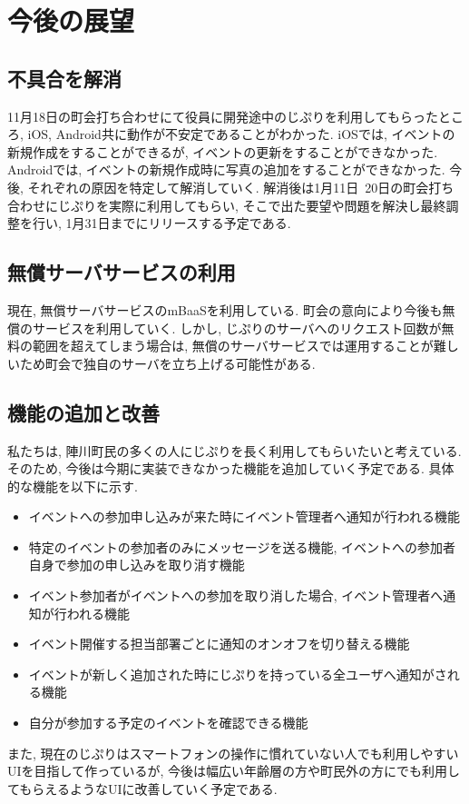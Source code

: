 \chapter{今後の展望}

\section{不具合を解消}
11月18日の町会打ち合わせにて役員に開発途中のじぷりを利用してもらったところ, iOS,  Android共に動作が不安定であることがわかった.
iOSでは, イベントの新規作成をすることができるが, イベントの更新をすることができなかった. Androidでは, イベントの新規作成時に写真の追加をすることができなかった.
今後, それぞれの原因を特定して解消していく. 解消後は1月11日~20日の町会打ち合わせにじぷりを実際に利用してもらい, そこで出た要望や問題を解決し最終調整を行い, 1月31日までにリリースする予定である.

\section{無償サーバサービスの利用}
現在, 無償サーバサービスのmBaaSを利用している. 町会の意向により今後も無償のサービスを利用していく. しかし, じぷりのサーバへのリクエスト回数が無料の範囲を超えてしまう場合は,
無償のサーバサービスでは運用することが難しいため町会で独自のサーバを立ち上げる可能性がある.

\section{機能の追加と改善}
私たちは, 陣川町民の多くの人にじぷりを長く利用してもらいたいと考えている. そのため, 今後は今期に実装できなかった機能を追加していく予定である. 具体的な機能を以下に示す.
\begin{itemize}
    \item イベントへの参加申し込みが来た時にイベント管理者へ通知が行われる機能
    \item 特定のイベントの参加者のみにメッセージを送る機能, イベントへの参加者自身で参加の申し込みを取り消す機能
    \item イベント参加者がイベントへの参加を取り消した場合, イベント管理者へ通知が行われる機能
    \item イベント開催する担当部署ごとに通知のオンオフを切り替える機能
    \item イベントが新しく追加された時にじぷりを持っている全ユーザへ通知がされる機能
    \item 自分が参加する予定のイベントを確認できる機能
\end{itemize}
また, 現在のじぷりはスマートフォンの操作に慣れていない人でも利用しやすいUIを目指して作っているが,
今後は幅広い年齢層の方や町民外の方にでも利用してもらえるようなUIに改善していく予定である.
